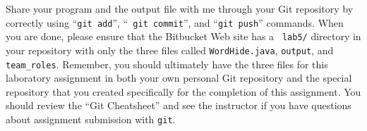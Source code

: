 \vspace{-0.1in}

Share your program and the output file with me through your Git repository by correctly using ``{\tt git add}'', ``{\tt
git commit}'', and ``{\tt git push}'' commands. When you are done, please ensure that the Bitbucket Web site has a {\tt
lab5/} directory in your repository with only the three files called {\tt WordHide.java}, {\tt output}, and {\tt
team\_roles}. Remember, you should ultimately have the three files for this laboratory assignment in both your own
personal Git repository and the special repository that you created specifically for the completion of this assignment.
You should review the ``Git Cheatsheet'' and see the instructor if you have questions about assignment submission with
{\tt git}.



